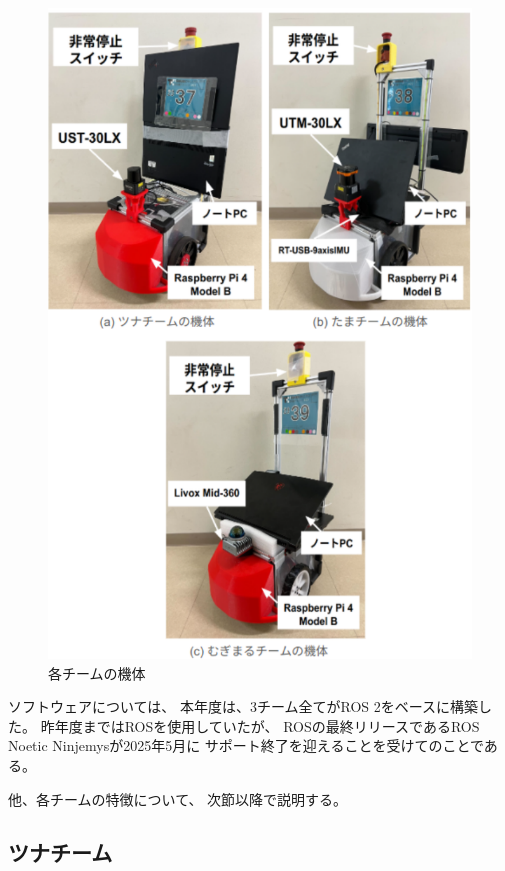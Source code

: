 \documentclass[twocolumn,9pt]{jsproceedings}
\begin{document}
\begin{figure}[h]
  \begin{center}
    \includegraphics[width=1.0\linewidth]{figs/robot.pdf}
    \caption{各チームの機体}
    \label{fig:robot}
  \end{center}
\end{figure}

ソフトウェアについては、
本年度は、3チーム全てがROS 2をベースに構築した。
昨年度まではROS\cite{ROS}を使用していたが、
ROSの最終リリースであるROS Noetic Ninjemysが2025年5月に
サポート終了を迎えることを受けてのことである。

他、各チームの特徴について、
次節以降で説明する。


\subsection{ツナチーム}
\end{document}

